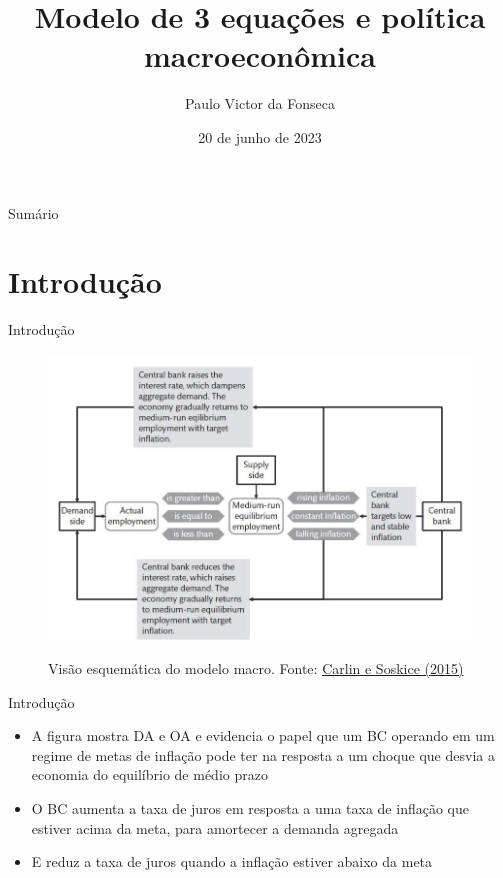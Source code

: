\documentclass[10pt]{beamer}
\title[]{Modelo de 3 equações e política macroeconômica}
\author[]{Paulo Victor da Fonseca}
\date{20 de junho de 2023}
\begin{document}
\begin{frame}[plain]
\end{frame}

\begin{frame}{Sumário}
    \tableofcontents
\end{frame}

\section{Introdução}
\begin{frame}
    {Introdução}
    \begin{figure}
        \href{https://bookdown.org/robohay/economicsnotes/Figures/Policy/BoEFig.jpg}{\includegraphics[width=.65\textwidth]{./figures/aula15_fig3.jpg}}
        \caption{Visão esquemática do modelo macro. Fonte: \href{https://bookdown.org/robohay/economicsnotes/Figures/Policy/BoEFig.jpg}{Carlin e Soskice (2015)}}
    \end{figure}
\end{frame}

\begin{frame}
    {Introdução}
    \begin{itemize}
        \item A figura mostra DA e OA e evidencia o papel que um BC operando em um regime de metas de inflação pode ter na resposta a um choque que desvia a economia do equilíbrio de médio prazo\bigskip
        \item O BC aumenta a taxa de juros em resposta a uma taxa de inflação que estiver acima da meta, para amortecer a demanda agregada\bigskip
        \item E reduz a taxa de juros quando a inflação estiver abaixo da meta
    \end{itemize}
\end{frame}
\end{document}
